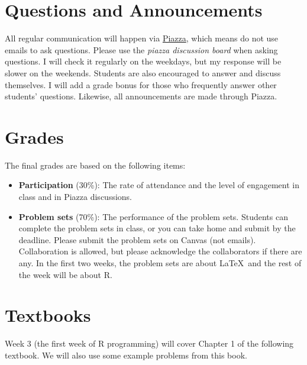 \documentclass[11pt]{article}
\begin{document}
\section{Questions and Announcements}

All regular communication will happen via \href{piazza.com/umich/fall2019/polsci514}{Piazza}, which means 
do not use emails to ask questions. 
Please use the {\it piazza discussion board} when asking questions.  
I will check it regularly on the weekdays, but my response will be slower on the weekends. 
Students are also encouraged to answer and discuss themselves.
I will add a grade bonus for those who frequently answer other students' questions. 
Likewise, all announcements are made through Piazza. 




\section{Grades}

The final grades are based on the following items:
\begin{itemize}
 \item {\bf Participation} (30\%): The rate of attendance and 
the level of engagement in class and in Piazza discussions.

 \item {\bf Problem sets} (70\%): The performance of the problem sets.
Students can complete the problem sets in class, or you can
take home and submit by the deadline. Please submit the problem sets on Canvas (not emails).  
Collaboration is allowed, but please acknowledge the collaborators if there are any.      
In the first two weeks, the problem sets are about \LaTeX\  and the rest of the week will be about R. 

\end{itemize}


\section{Textbooks}

Week 3 (the first week of R programming) will cover Chapter 1 of the following textbook. 
We will also use some example problems from this book. 

\begin{bibunit}[unsrtnat]
\nocite{imai17:_quant_social_scien}
\putbib[syl514]
\end{bibunit}
\vspace*{1em}      
\end{document}
